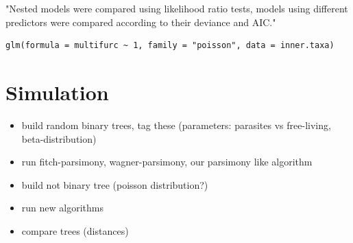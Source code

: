       "Nested models were compared using likelihood ratio tests, models using different predictors were 
      compared according to their deviance and AIC."
      \begin{lstlisting}[gobble=8]
        glm(formula = multifurc ~ 1, family = "poisson", data = inner.taxa)
      \end{lstlisting}


  \section{Simulation}\label{sec:simulation}
    \begin{itemize}
      \item build random binary trees, tag these (parameters: parasites vs free-living, 
        beta-distribution)
      \item run fitch-parsimony, wagner-parsimony, our parsimony like algorithm
      \item build not binary tree (poisson distribution?)
      \item run new algorithms
      \item compare trees (distances)
    \end{itemize}

